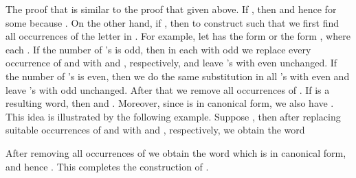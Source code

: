 \documentclass[fontsize=11pt,DIV=13,paper=letter]{scrartcl}
\theoremstyle{definition}
\begin{document}
The proof that  is similar to the proof that  given above. If , then  and hence  for some  because . On the other hand, if , then to construct  such that  we first find all occurrences of the letter  in . For example, let  has the form  or the form , where each . If the number of 's is odd, then in each  with odd  we replace every occurrence of  and  with  and , respectively, and leave 's with even  unchanged. If the number of 's is even, then we do the same substitution in all 's with even  and leave 's with odd  unchanged. After that we remove all occurrences of . If  is a resulting word, then  and . Moreover, since  is in canonical form, we also have . This idea is illustrated by the following example. Suppose , then after replacing suitable occurrences of  and  with  and , respectively, we obtain the word

After removing all occurrences of  we obtain the word  which is in canonical form, and hence . This completes the construction of .





\end{document}
